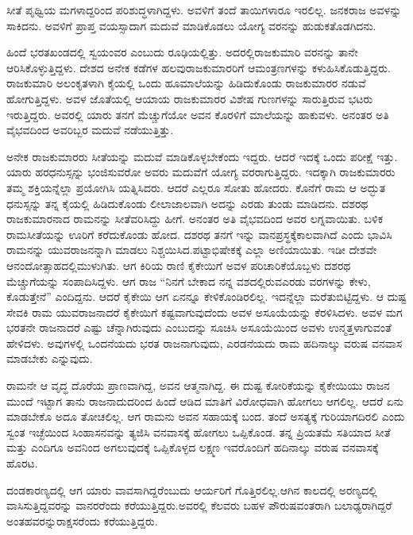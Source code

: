 ಸೀತೆ ಪೃಥ್ವಿಯ ಮಗಳಾದ್ದರಿಂದ ಪರಿಶುದ್ಧಳಾಗಿದ್ದಳು. ಅವಳಿಗೆ ತಂದೆ ತಾಯಿಗಳಾರೂ ಇರಲಿಲ್ಲ. ಜನಕರಾಜ ಅವಳನ್ನು ಸಾಕಿದನು. ಅವಳಿಗೆ ಪ್ರಾಪ್ತ ವಯಸ್ಸಾದಾಗ ಮದುವೆ ಮಾಡಿಕೊಡಲು ಯೋಗ್ಯ ವರನನ್ನು ಹುಡುಕತೊಡಗಿದನು.

ಹಿಂದೆ ಭರತಖಂಡದಲ್ಲಿ ಸ್ವಯಂವರ ಎಂಬುದು ರೂಢಿಯಲ್ಲಿತ್ತು. ಅದರಲ್ಲಿ\break ರಾಜಕುಮಾರಿ ವರನನ್ನು ತಾನೇ ಆರಿಸಿಕೊಳ್ಳುತ್ತಿದ್ದಳು. ದೇಶದ ಅನೇಕ ಕಡೆಗಳ ಹಲವು\break ರಾಜಕುಮಾರರಿಗೆ ಆಮಂತ್ರಣಗಳನ್ನು ಕಳುಹಿಸಿಕೊಡುತ್ತಿದ್ದರು. ರಾಜಕುಮಾರಿ ಅಲಂಕೃತಳಾಗಿ ಕೈಯಲ್ಲಿ ಒಂದು ಹೂಮಾಲೆಯನ್ನು ಹಿಡಿದುಕೊಂಡು ರಾಜಕುಮಾರರ ನಡುವೆ ಹೋಗುತ್ತಿದ್ದಳು. ಅವಳ ಜೊತೆಯಲ್ಲಿ ಆಯಾಯ ರಾಜಕುಮಾರರ ವಿಶೇಷ ಗುಣಗಳನ್ನು ಸಾರುತ್ತಿರುವ ಭಟರು ಇರುತ್ತಿದ್ದರು. ಅವರಲ್ಲಿ ಯಾರು ತನಗೆ ಮೆಚ್ಚುಗೆಯೋ ಅವನ ಕೊರಳಿಗೆ ಮಾಲೆಯನ್ನು ಹಾಕುವಳು. ಅನಂತರ ಅತಿ ವೈಭವದಿಂದ ಅವರಿಬ್ಬರ ಮದುವೆ ನಡೆಯುತ್ತಿತ್ತು.

ಅನೇಕ ರಾಜಕುಮಾರರು ಸೀತೆಯನ್ನು ಮದುವೆ ಮಾಡಿಕೊಳ್ಳಬೇಕೆಂದು ಇದ್ದರು. ಆದರೆ ಇದಕ್ಕೆ ಒಂದು ಪರೀಕ್ಷೆ ಇತ್ತು. ಯಾರು ಹರಧನುಸ್ಸನ್ನು ಭಂಜಿಸುವರೋ ಅವರು ಮದುವೆಗೆ ಯೋಗ್ಯ ವರರಾಗುತ್ತಿದ್ದರು. ಇದಕ್ಕಾಗಿ ರಾಜಕುಮಾರರು ತಮ್ಮ ಶಕ್ತಿಯನ್ನೆಲ್ಲಾ ಪ್ರಯೋಗಿಸಿ ಯತ್ನಿಸಿದರು. ಆದರೆ ಎಲ್ಲರೂ ಸೋತು ಹೋದರು. ಕೊನೆಗೆ ರಾಮ ಆ ಅದ್ಭುತ ಧನುಸ್ಸನ್ನು ತನ್ನ ಕೈಯಲ್ಲಿ ಹಿಡಿದುಕೊಂಡು ಲೀಲಾಜಾಲವಾಗಿ ಅದನ್ನು ಎರಡು ತುಂಡು ಮಾಡಿದನು. ದಶರಥ ರಾಜಕುಮಾರನಾದ ರಾಮನನ್ನು ಸೀತೆ\break ವರಿಸಿದ್ದು ಹೀಗೆ. ಅನಂತರ ಅತಿ ವೈಭವದಿಂದ ಅವರ ಲಗ್ನವಾಯಿತು. ಬಳಿಕ ರಾಮ\break ಸೀತೆಯನ್ನು ಊರಿಗೆ ಕರೆದುಕೊಂಡು ಹೋದ. ದಶರಥ ತನಗೆ ಇನ್ನು ವಾನಪ್ರಸ್ಥಕ್ಕೆ\break ಕಾಲವಾಗಿದೆ ಎಂದು ಭಾವಿಸಿ ರಾಮನನ್ನು ಯುವರಾಜನನ್ನಾಗಿ ಮಾಡಲು ನಿಶ್ಚಯಿಸಿದ.\break ಪಟ್ಟಾಭಿಷೇಕಕ್ಕೆ ಎಲ್ಲಾ ಅಣಿಯಾಯಿತು. ಇಡೀ ದೇಶವೇ ಆನಂದೋತ್ಸಾಹದಲ್ಲಿ\break ಮುಳುಗಿತು. ಆಗ ಕಿರಿಯ ರಾಣಿ ಕೈಕೇಯಿಗೆ ಅವಳ ಪರಿಚಾರಿಕೆಯೊಬ್ಬಳು ದಶರಥ ಮೆಚ್ಚುಗೆಯನ್ನು ಸಂಪಾದಿಸಿದ್ದಳು. ಆಗ ರಾಜ “ನಿನಗೆ ಬೇಕಾದ ನನ್ನ ವಶದಲ್ಲಿರುವ\break ಎರಡು ವರಗಳನ್ನು ಕೇಳು, ಕೊಡುತ್ತೇನೆ” ಎಂದಿದ್ದನು. ಆದರೆ ಕೈಕೇಯಿ ಆಗ ಏನನ್ನೂ ಕೇಳಿಕೊಂಡಿರಲಿಲ್ಲ. ಇದನ್ನೆಲ್ಲಾ ಮರೆತುಬಿಟ್ಟಿದ್ದಳು. ಆ ದುಷ್ಟ ಸೇವಕಿ ರಾಮ ಯುವರಾಜನಾದರೆ ಕೈಕೇಯಿಗೆ ಕಷ್ಟವಾಗುವುದೆಂದು ಅವಳ ಅಸೂಯೆಯನ್ನು ಕೆರಳಿಸಿದಳು. ಅವಳ ಮಗ ಭರತನೇ ರಾಜನಾದರೆ ಎಷ್ಟು ಚೆನ್ನಾಗಿರುವುದು ಎಂಬುದನ್ನು ಸೂಚಿಸಿ ಅಸೂಯೆಯಿಂದ ಅವಳು ಉನ್ಮತ್ತಳಾಗುವಂತೆ ಹೇಳಿದಳು. ಅವುಗಳಲ್ಲಿ ಒಂದನೆಯದು ಭರತ ರಾಜನಾಗುವುದು, ಎರಡನೆಯದು ರಾಮ ಹದಿನಾಲ್ಕು ವರುಷ ವನವಾಸ ಮಾಡಬೇಕು ಎನ್ನುವುದು.

ರಾಮನೇ ಆ ವೃದ್ಧ ದೊರೆಯ ಪ್ರಾಣವಾಗಿದ್ದ, ಅವನ ಆತ್ಮನಾಗಿದ್ದ. ಈ ದುಷ್ಟ ಕೋರಿಕೆಯನ್ನು ಕೈಕೇಯಿಯು ರಾಜನ ಮುಂದೆ ಇಟ್ಟಾಗ ತಾನು ರಾಜನಾದುದರಿಂದ ಹಿಂದೆ ಆಡಿದ ಮಾತಿಗೆ ವಿರೋಧವಾಗಿ ಹೋಗಲು ಆಗಲಿಲ್ಲ. ಆದರೆ ಏನು ಮಾಡಬೇಕೊ ಅದೂ ತೋಚಲಿಲ್ಲ. ಆಗ ರಾಮನು ಅವನ ಸಹಾಯಕ್ಕೆ ಬಂದ. ತಂದೆ ಅಸತ್ಯಕ್ಕೆ ಗುರಿಯಾಗದಿರಲಿ ಎಂದು ಸ್ವಂತ ಇಚ್ಛೆಯಿಂದ ಸಿಂಹಾಸನವನ್ನು ತ್ಯಜಿಸಿ ವನವಾಸಕ್ಕೆ ಹೋಗಲು ಒಪ್ಪಿಕೊಂಡ. ತನ್ನ ಪ್ರಿಯತಮೆ ಸತಿಯಾದ ಸೀತೆ ಮತ್ತು ಎಂದಿಗೂ ಅವನಿಂದ ಅಗಲುವುದಕ್ಕೆ ಒಪ್ಪಿಕೊಳ್ಳದ ಲಕ್ಷ್ಮಣ ಇವರೊಂದಿಗೆ ಹದಿನಾಲ್ಕು ವರುಷ ವನವಾಸಕ್ಕೆ ಹೊರಟ.

ದಂಡಕಾರಣ್ಯದಲ್ಲಿ ಆಗ ಯಾರು ವಾವಸಾಗಿದ್ದರೆಂಬುದು ಆರ್ಯರಿಗೆ ಗೊತ್ತಿರಲಿಲ್ಲ.\break ಆಗಿನ ಕಾಲದಲ್ಲಿ ಅರಣ್ಯದಲ್ಲಿ ವಾಸಿಸುತ್ತಿದ್ದವರನ್ನು ವಾನರರೆಂದು ಕರೆಯುತ್ತಿದ್ದರು.\break ಅವರಲ್ಲಿ ಕೆಲವರು ಬಹಳ ಪೌರುಷವಂತರಾಗಿ ಬಲಾಢ್ಯರಾಗಿದ್ದರೆ ಅಂತಹವರನ್ನು\break ರಾಕ್ಷಸರೆಂದು ಕರೆಯುತ್ತಿದ್ದರು.

